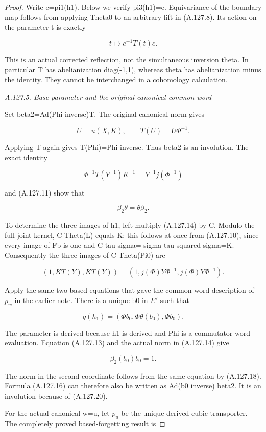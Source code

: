 \begin{proof}
Write e=pi1(h1). Below we verify pi3(h1)=e. Equivariance of the boundary map follows from applying Theta0 to an arbitrary lift in (A.127.8). Its action on the parameter t is exactly

\[
 t\longmapsto e^{-1}T(t)e.
\tag{A.127.16}
\]

This is an actual corrected reflection, not the simultaneous inversion theta. In particular T has abelianization diag(-1,1), whereas theta has abelianization minus the identity. They cannot be interchanged in a cohomology calculation.

\par\smallskip\noindent\emph{A.127.5. Base parameter and the original canonical common word}

Set beta2=Ad(Phi inverse)T. The original canonical norm gives

\[
 U=u(X,K),\qquad T(U)=U\Phi^{-1}.
\tag{A.127.17}
\]

Applying T again gives T(Phi)=Phi inverse. Thus beta2 is an involution. The exact identity

\[
 \Phi^{-1}T(Y^{-1})K^{-1}=Y^{-1}j(\Phi^{-1})
\]

and (A.127.11) show that

\[
 \beta_2\theta=\theta\beta_2.
\tag{A.127.18}
\]

To determine the three images of h1, left-multiply (A.127.14) by C. Modulo the full joint kernel, C Theta(L) equals K: this follows at once from (A.127.10), since every image of Fb is one and C tau sigma= sigma tau squared sigma=K. Consequently the three images of C Theta(Pi0) are

\[
 (1,K T(Y),K T(Y))=(1,j(\Phi)Y\Phi^{-1},j(\Phi)Y\Phi^{-1}).
\]

Apply the same two based equations that gave the common-word description of \(p_w\) in the earlier note. There is a unique b0 in \(E'\) such that

\[
 q(h_1)=(\Phi b_0,\Phi\theta(b_0),\Phi b_0).
\tag{A.127.19}
\]

The parameter is derived because h1 is derived and Phi is a commutator-word evaluation. Equation (A.127.13) and the actual norm in (A.127.14) give

\[
 \beta_2(b_0)b_0=1.
\tag{A.127.20}
\]

The norm in the second coordinate follows from the same equation by (A.127.18). Formula (A.127.16) can therefore also be written as Ad(b0 inverse) beta2. It is an involution because of (A.127.20).

For the actual canonical w=u, let \(p_u\) be the unique derived cubic transporter. The completely proved based-forgetting result is


\end{proof}

